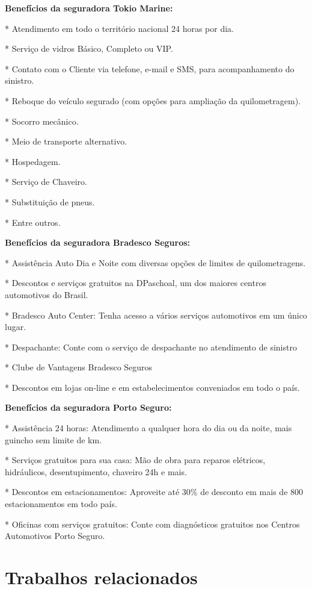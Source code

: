 \textbf{Benefícios da seguradora Tokio Marine:}

* Atendimento em todo o território nacional 24 horas por dia.

* Serviço de vidros Básico, Completo ou VIP.

* Contato com o Cliente via telefone, e-mail e SMS, para acompanhamento do sinistro.

* Reboque do veículo segurado (com opções para ampliação da quilometragem).

* Socorro mecânico.

* Meio de transporte alternativo.

* Hospedagem.

* Serviço de Chaveiro.

* Substituição de pneus.

* Entre outros.
\newline

\textbf{Benefícios da seguradora Bradesco Seguros:}

* Assistência Auto Dia e Noite com diversas opções de limites de quilometragens.

* Descontos e serviços gratuitos na DPaschoal, um dos maiores centros automotivos do Brasil.

* Bradesco Auto Center: Tenha acesso a vários serviços automotivos em um único lugar.

* Despachante: Conte com o serviço de despachante no atendimento de sinistro

* Clube de Vantagens Bradesco Seguros

* Descontos em lojas on-line e em estabelecimentos conveniados em todo o país.
\newline

\textbf{Benefícios da seguradora Porto Seguro:}

* Assistência 24 horas: Atendimento a qualquer hora do dia ou da noite, mais guincho sem limite de km.

* Serviços gratuitos para sua casa: Mão de obra para reparos elétricos, hidráulicos, desentupimento, chaveiro 24h e mais.

* Descontos em estacionamentos: Aproveite até 30\% de desconto em mais de 800 estacionamentos em todo país.

* Oficinas com serviços gratuitos: Conte com diagnósticos gratuitos nos Centros Automotivos Porto Seguro.



\section{\esp Trabalhos relacionados}


